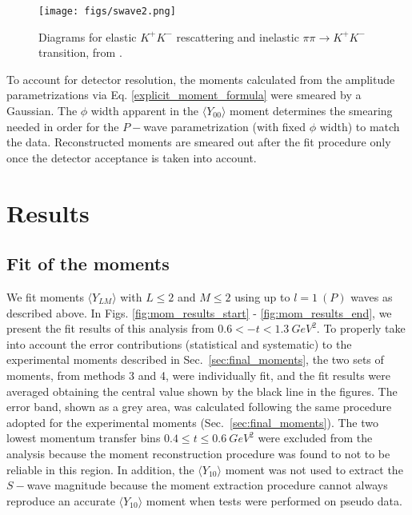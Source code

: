 \documentclass[twocolumn,superscriptaddress,prd]{revtex4}
\begin{document}
 \begin{figure}
\texttt{[image: figs/swave2.png]}
\caption{Diagrams for elastic $K^+ K^-$ rescattering and inelastic $\pi \pi \rightarrow K^+ K^-$ transition, from \cite{Lesniak:2005}.}
\label{fig:feynman3}
\end{figure}
\noindent


To account for detector resolution, the moments calculated from the amplitude parametrizations via Eq. \ref{explicit_moment_formula} were smeared by a Gaussian. The $\phi$ width apparent in the $\langle Y_{00} \rangle$ moment determines the smearing needed in order for the $P-$wave parametrization (with fixed $\phi$ width) to match the data. 
Reconstructed moments are smeared out after the fit procedure only once the detector acceptance is taken into account. 

\section{Results}\label{sec:res}

\subsection{Fit of the moments}

We fit moments $\langle Y_{LM} \rangle$ with $L \le 2$ and $M \le 2$ using up to $l=1\ (P)$ waves as described above. 
In Figs. \ref{fig:mom_results_start} - \ref{fig:mom_results_end}, we present the fit results of this analysis from $0.6 < -t < 1.3 \ GeV^2 $. To properly take into account the error contributions (statistical and systematic) to the experimental moments described in Sec.~\ref{sec:final_moments}, the two sets of moments, from methods 3 and 4, were individually fit, and the fit results were averaged obtaining the central value shown by the black line in the figures. The error band, shown as a grey area, was calculated following the same procedure adopted for the experimental moments (Sec.~\ref{sec:final_moments}). The two lowest momentum transfer bins $ 0.4 \le t \le 0.6 \ GeV^2$ were excluded from the analysis because the moment reconstruction procedure was found to not to be reliable in this region. In addition, the $\langle Y_{10} \rangle$ moment was not used to extract the $S-$wave magnitude because the moment extraction procedure cannot always reproduce an accurate $\langle Y_{10} \rangle$ moment when tests were performed on pseudo data. 
\end{document}

